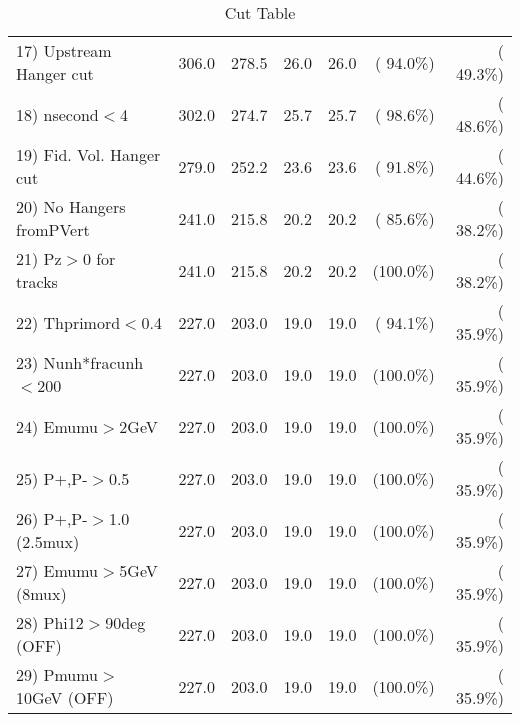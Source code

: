 \begin{table}[h!]
\begin{tabular}{||l||r|r|r|r|r|r||}
 17) Upstream Hanger cut  &        306.0 &        278.5 &         26.0 &         26.0 & ( 94.0\%) & ( 49.3\%) \\
 18) nsecond$<$4          &        302.0 &        274.7 &         25.7 &         25.7 & ( 98.6\%) & ( 48.6\%) \\
 19) Fid. Vol. Hanger cut &        279.0 &        252.2 &         23.6 &         23.6 & ( 91.8\%) & ( 44.6\%) \\
 20) No Hangers fromPVert &        241.0 &        215.8 &         20.2 &         20.2 & ( 85.6\%) & ( 38.2\%) \\
 21) Pz$>$0 for tracks    &        241.0 &        215.8 &         20.2 &         20.2 & (100.0\%) & ( 38.2\%) \\
 22) Thprimord$<$0.4      &        227.0 &        203.0 &         19.0 &         19.0 & ( 94.1\%) & ( 35.9\%) \\
 23) Nunh*fracunh$<$200   &        227.0 &        203.0 &         19.0 &         19.0 & (100.0\%) & ( 35.9\%) \\
 24) Emumu$>$2GeV         &        227.0 &        203.0 &         19.0 &         19.0 & (100.0\%) & ( 35.9\%) \\
 25) P+,P-$>$0.5          &        227.0 &        203.0 &         19.0 &         19.0 & (100.0\%) & ( 35.9\%) \\
 26) P+,P-$>$1.0 (2.5mux) &        227.0 &        203.0 &         19.0 &         19.0 & (100.0\%) & ( 35.9\%) \\
 27) Emumu$>$5GeV  (8mux) &        227.0 &        203.0 &         19.0 &         19.0 & (100.0\%) & ( 35.9\%) \\
 28) Phi12$>$90deg  (OFF) &        227.0 &        203.0 &         19.0 &         19.0 & (100.0\%) & ( 35.9\%) \\
 29) Pmumu$>$10GeV  (OFF) &        227.0 &        203.0 &         19.0 &         19.0 & (100.0\%) & ( 35.9\%) \\
 \hline
 \hline
 \end{tabular}
 \caption{Cut Table           }
 \label{tab-cutcohjpsi-mumu_anumucc}
 \end{table}
